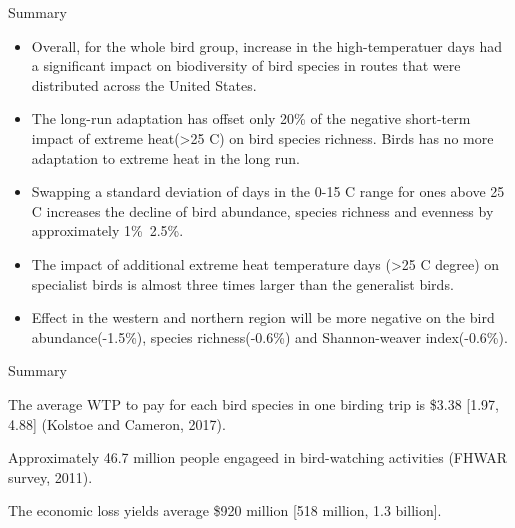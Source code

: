 \documentclass{beamer}
\begin{document}
\begin{frame}{Summary}

  \footnotesize
  \begin{itemize}
  \item
  Overall, for the whole bird group, increase in the high-temperatuer days had a significant impact on biodiversity of bird species in routes that were distributed across the United States.
  \item The long-run adaptation has offset only 20\% of the negative short-term impact of extreme heat(>25 C) on bird species richness. Birds has no more adaptation to extreme heat in the long run.
  \item
    Swapping a standard deviation of days in the 0-15 C range for ones above 25 C increases the decline of bird abundance, species richness and evenness by approximately 1\%~2.5\%.
  \item
  The impact of additional extreme heat temperature days (>25 C degree) on specialist birds is almost three times larger than the generalist birds.
  \item
  Effect in the western and northern region will be more negative on the bird abundance(-1.5\%), species richness(-0.6\%) and Shannon-weaver index(-0.6\%).
  \end{itemize}
\end{frame}

\begin{frame}{Summary}
  \item The average WTP to pay for each bird species in one birding trip is \$3.38 [1.97, 4.88] (Kolstoe and Cameron, 2017).
  \item Approximately 46.7 million people engageed in bird-watching activities (FHWAR survey, 2011).
  \item The economic loss yields average \$920 million [518 million, 1.3 billion].
\end{frame}
\end{document}
